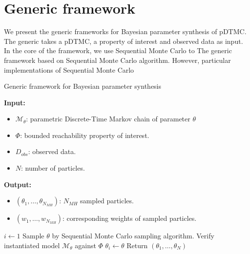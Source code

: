 \section{Generic framework}
We present the generic frameworks for Bayesian parameter synthesis of pDTMC. The generic takes a
pDTMC, a property of interest and observed data as input. In the core of the framework, we use
Sequential Monte Carlo to  The generic framework based on Sequential Monte Carlo algorithm. However,
particular implementations of Sequential Monte Carlo
\begin{algorithm}[H]
      \caption{Generic framework for Bayesian parameter synthesis}
      \label{alg:generic-framework}
      \footnotesize{
            \hspace*{\algorithmicindent} \textbf{Input:}
            \begin{itemize}
                  \item $\mathcal{M}_\theta$: parametric Discrete-Time Markov chain of parameter $\theta$
                  \item $\Phi$: bounded reachability property of interest.
                  \item $D_{obs}$: observed data.
                  \item $N$: number of particles.
            \end{itemize}
            \hspace*{\algorithmicindent} \textbf{Output:}
            \begin{itemize}
                  \item $(\theta_1,\ldots,\theta_{N_{MH}})$: $N_{MH}$ sampled particles.
                  \item $(w_1,\ldots,w_{N_{MH}})$: corresponding weights of sampled particles.
            \end{itemize}
      }
      \begin{algorithmic}[1]
            \State $i \leftarrow 1$
            \State Sample $\theta$ by Sequential Monte Carlo sampling algorithm.
            \State Verify instantiated model $\mathcal{M}_\theta$ against $\Phi$
            \State $\theta_i \leftarrow \theta$
            \EndIf
            \EndWhile
            \State Return $(\theta_1,\ldots,\theta_N)$
            \EndProcedure
      \end{algorithmic}
\end{algorithm}

